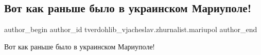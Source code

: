 
 
 
 
 

\subsection{Вот как раньше было в украинском Мариуполе!}
\label{sec:02_02_2023.fb.tverdohlib_vjacheslav.zhurnalist.mariupol.1.vot_kak_ranshe_bilo_}

\ifcmt
 author_begin
   author_id tverdohlib_vjacheslav.zhurnalist.mariupol
 author_end
\fi

Вот как раньше было в украинском Мариуполе!
